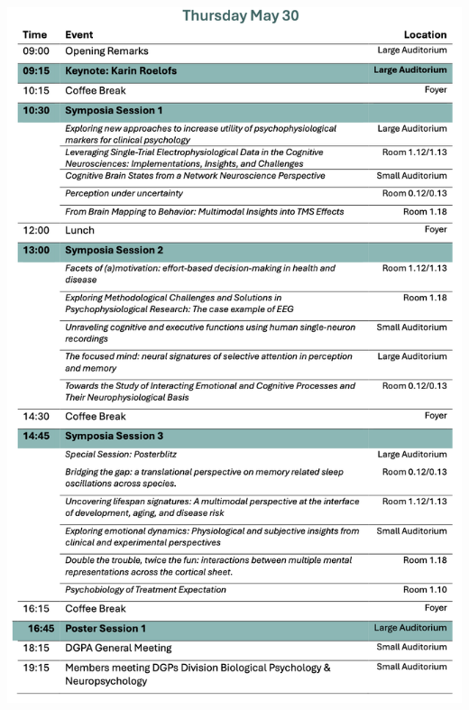     \begin{center}
		\includegraphics[width=1\textwidth]{tex/images/programme_overview/Thu.png}
	\end{center}
		
	\newpage

